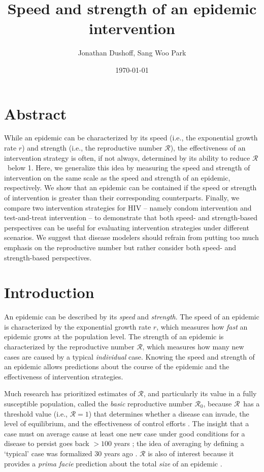 \documentclass[12pt]{article}
\title{Speed and strength of an epidemic intervention}
\author{Jonathan Dushoff, Sang Woo Park}
\date{\today}
\newcommand{\Rx}[1]{\ensuremath{{\mathcal R}_{#1}}}
\newcommand{\Ro}{\Rx{0}}
\newcommand{\RR}{\ensuremath{{\mathcal R}}}
\begin{document}
\maketitle

\section*{Abstract}

While an epidemic can be characterized by its speed (i.e., the exponential growth rate $r$) and strength (i.e., the reproductive number \RR), the effectiveness of an intervention strategy is often, if not always, determined by its ability to reduce \RR\ below 1.
Here, we generalize this idea by measuring the speed and strength of intervention on the same scale as the speed and strength of an epidemic, respectively.
We show that an epidemic can be contained if the speed or strength of intervention is greater than their corresponding counterparts.
Finally, we compare two intervention strategies for HIV -- namely condom intervention and test-and-treat intervention -- to demonstrate that both speed- and strength-based perspectives can be useful for evaluating intervention strategies under different scenarios.
We suggest that disease modelers should refrain from putting too much emphasis on the reproductive number but rather consider both speed- and strength-based perspectives.

\section{Introduction}

An epidemic can be described by its \emph{speed} and \emph{strength}.
The speed of an epidemic is characterized by the exponential growth rate $r$, which measures how \emph{fast} an epidemic grows at the population level.
The strength of an epidemic is characterized by the reproductive number \RR, which measures how many new cases are caused by a typical \emph{individual} case.
Knowing the speed and strength of an epidemic allows predictions about the course of the epidemic and the effectiveness of intervention strategies.

Much research has prioritized estimates of \RR, and particularly its value in a fully susceptible population, called the \emph{basic} reproductive number \Ro, because \RR\ has a threshold value (i.e., $\RR=1$) that determines whether a disease can invade, the level of equilibrium, and the effectiveness of control efforts \citep{anderson1991infectious, diekmann1990definition}.
The insight that a case must on average cause at least one new case under good conditions for a disease to persist goes back $>100$ years \citep{ross1911prevention};
the idea of averaging by defining a `typical' case was formalized 30 years ago \citep{diekmann1990definition}.
$\RR$ is also of interest because it provides a \emph{prima facie} prediction about the total \emph{size} of an epidemic \citep{anderson1991infectious, ma2006generality, arino2007final, andreasen2011final, miller2012note}.
\end{document}
